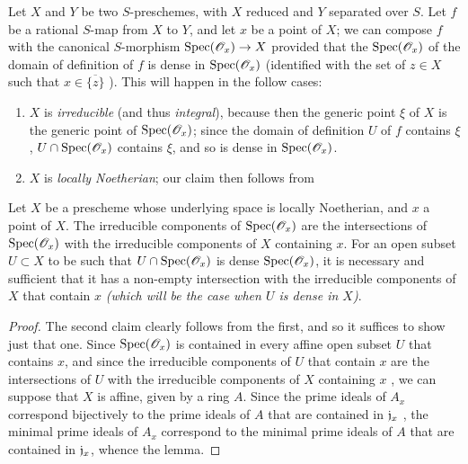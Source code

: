 \begin{env}[7.2.8]
\label{1.7.2.8}
Let $X$ and $Y$ be two $S$-preschemes, with $X$ reduced and $Y$ separated over $S$.
Let $f$ be a rational $S$-map from $X$ to $Y$, and let $x$ be a point of $X$; we can compose $f$ with the canonical $S$-morphism ${\mathop{\mathrm{Spec}}\nolimits}(\mathscr{O}_x)\to X$  provided that the  ${\mathop{\mathrm{Spec}}\nolimits}(\mathscr{O}_x)$ of the domain of definition of $f$ is dense in ${\mathop{\mathrm{Spec}}\nolimits}(\mathscr{O}_x)$ (identified with the set of $z\in X$ such that $x\in\overline{\{z\}}$ ).
This will happen in the follow cases:
\begin{enumerate}
    \item $X$ is \emph{irreducible} (and thus \emph{integral}), because then the generic point $\xi$ of $X$ is the generic point of ${\mathop{\mathrm{Spec}}\nolimits}(\mathscr{O}_x)$; since the domain of definition $U$ of $f$ contains $\xi$, $U\cap{\mathop{\mathrm{Spec}}\nolimits}(\mathscr{O}_x)$ contains $\xi$, and so is dense in ${\mathop{\mathrm{Spec}}\nolimits}(\mathscr{O}_x)$.
    \item $X$ is \emph{locally Noetherian}; our claim then follows from
\end{enumerate}
\end{env}

\begin{lem}[7.2.8.1]
\label{1.7.2.8.1}
Let $X$ be a prescheme whose underlying space is locally Noetherian, and $x$ a point of $X$.
The irreducible components of ${\mathop{\mathrm{Spec}}\nolimits}(\mathscr{O}_x)$ are the intersections of ${\mathop{\mathrm{Spec}}\nolimits}(\mathscr{O}_x)$ with the irreducible components of $X$ containing $x$.
For an open subset $U\subset X$ to be such that $U\cap{\mathop{\mathrm{Spec}}\nolimits}(\mathscr{O}_x)$ is dense ${\mathop{\mathrm{Spec}}\nolimits}(\mathscr{O}_x)$, it is necessary and sufficient that it has a non-empty intersection with the irreducible components of $X$ that contain $x$ \emph{(which will be the case when $U$ is \emph{dense} in $X$)}.
\end{lem}

\begin{proof}
\label{proof-1.7.2.8.1}
The second claim clearly follows from the first, and so it suffices to show just that one.
Since ${\mathop{\mathrm{Spec}}\nolimits}(\mathscr{O}_x)$ is contained in every affine open subset $U$ that contains $x$, and since the irreducible components of $U$ that contain $x$ are the intersections of $U$ with the irreducible components of $X$ containing $x$ , we can suppose that $X$ is affine, given by a ring $A$.
Since the prime ideals of $A_x$ correspond bijectively to the prime ideals of $A$ that are contained in $\mathfrak{j}_x$ , the minimal prime ideals of $A_x$ correspond to the minimal prime ideals of $A$ that are contained in $\mathfrak{j}_x$, whence the lemma.
\end{proof}

